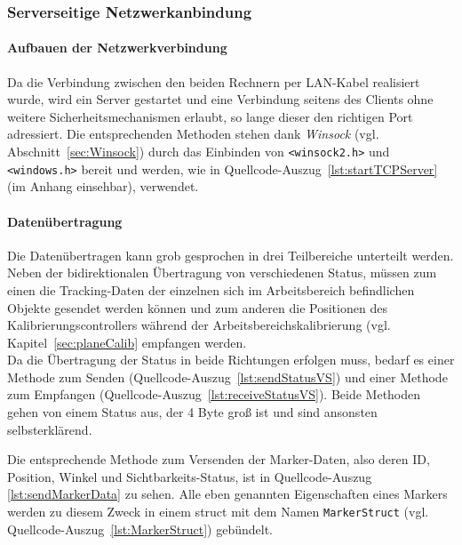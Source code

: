 \subsubsection{Serverseitige Netzwerkanbindung}
\paragraph{Aufbauen der Netzwerkverbindung}
Da die Verbindung zwischen den beiden Rechnern per LAN-Kabel realisiert wurde, wird ein Server gestartet und eine Verbindung seitens des Clients ohne weitere Sicherheitsmechanismen erlaubt, so lange dieser den richtigen Port adressiert. Die entsprechenden Methoden stehen dank \textit{Winsock} (vgl. Abschnitt~\ref{sec:Winsock}) durch das Einbinden von \texttt{<winsock2.h>} und \texttt{<windows.h>} bereit und werden, wie in Quellcode-Auszug~\ref{lst:startTCPServer} (im Anhang einsehbar), verwendet. 

\paragraph{Datenübertragung}
Die Datenübertragen kann grob gesprochen in drei Teilbereiche unterteilt werden. Neben der bidirektionalen Übertragung von verschiedenen Status, müssen zum einen die Tracking-Daten der einzelnen sich im Arbeitsbereich befindlichen Objekte gesendet werden können und zum anderen die Positionen des Kalibrierungscontrollers während der Arbeitsbereichskalibrierung (vgl. Kapitel~\ref{sec:planeCalib} empfangen werden. \\

 

Da die Übertragung der Status in beide Richtungen erfolgen muss, bedarf es einer Methode zum Senden (Quellcode-Auszug~\ref{lst:sendStatusVS})  und einer Methode zum Empfangen (Quellcode-Auszug~\ref{lst:receiveStatusVS}). Beide Methoden gehen von einem Status aus, der 4 Byte groß ist und sind ansonsten selbsterklärend. 



Die entsprechende Methode zum Versenden der Marker-Daten, also deren ID, Position, Winkel und Sichtbarkeits-Status, ist in Quellcode-Auszug \ref{lst:sendMarkerData} zu sehen. Alle eben genannten Eigenschaften eines Markers werden zu diesem Zweck in einem struct mit dem Namen \texttt{MarkerStruct} (vgl. Quellcode-Auszug~\ref{lst:MarkerStruct}) gebündelt. 

